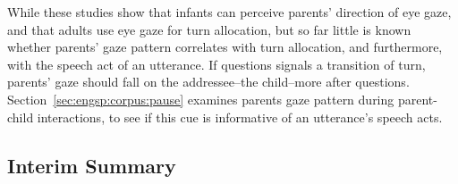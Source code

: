 
 
While these studies show that infants can perceive parents' direction of eye gaze, and that adults use eye gaze for turn allocation, but so far little is known whether parents' gaze pattern correlates with turn allocation, and furthermore, with the speech act of an utterance. If questions signals a transition of turn, parents' gaze should fall on the addressee--the child--more after questions. Section~\ref{sec:engsp:corpus:pause} examines parents gaze pattern during parent-child interactions, to see if this cue is informative of an utterance's speech acts.

\subsection{Interim Summary}
\label{sec:engsp:bg:summary}

